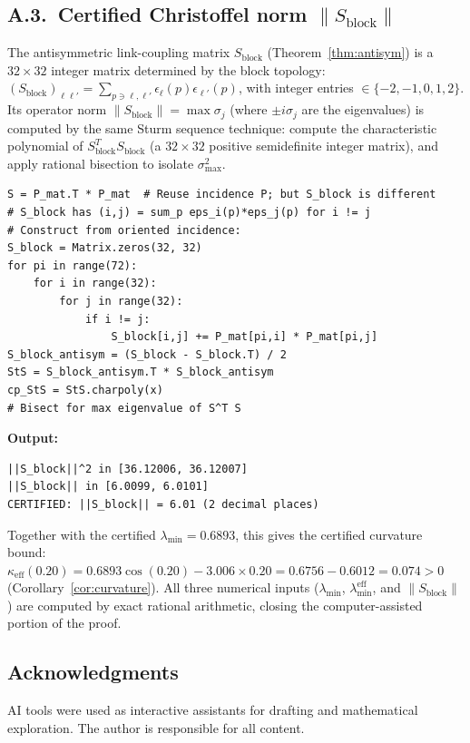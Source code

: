 \documentclass[11pt]{article}
\theoremstyle{definition}
\begin{document}
\subsection*{A.3.~Certified Christoffel norm $\|S_{\mathrm{block}}\|$}

The antisymmetric link-coupling matrix $S_{\mathrm{block}}$
(Theorem~\ref{thm:antisym}) is a $32\times 32$ integer matrix
determined by the block topology:
$(S_{\mathrm{block}})_{\ell\ell'}
=\sum_{p\ni\ell,\ell'}\epsilon_\ell(p)\epsilon_{\ell'}(p)$,
with integer entries $\in\{-2,-1,0,1,2\}$.  Its operator norm
$\|S_{\mathrm{block}}\|=\max\sigma_j$ (where $\pm i\sigma_j$
are the eigenvalues) is computed by the same Sturm sequence
technique: compute the characteristic polynomial of
$S_{\mathrm{block}}^T S_{\mathrm{block}}$ (a $32\times 32$
positive semidefinite integer matrix), and apply rational bisection
to isolate $\sigma_{\max}^2$.

\begin{verbatim}
S = P_mat.T * P_mat  # Reuse incidence P; but S_block is different
# S_block has (i,j) = sum_p eps_i(p)*eps_j(p) for i != j
# Construct from oriented incidence:
S_block = Matrix.zeros(32, 32)
for pi in range(72):
    for i in range(32):
        for j in range(32):
            if i != j:
                S_block[i,j] += P_mat[pi,i] * P_mat[pi,j]
S_block_antisym = (S_block - S_block.T) / 2
StS = S_block_antisym.T * S_block_antisym
cp_StS = StS.charpoly(x)
# Bisect for max eigenvalue of S^T S
\end{verbatim}

\noindent\textbf{Output:}
\begin{verbatim}
||S_block||^2 in [36.12006, 36.12007]
||S_block|| in [6.0099, 6.0101]
CERTIFIED: ||S_block|| = 6.01 (2 decimal places)
\end{verbatim}

\noindent Together with the certified $\lambda_{\min}=0.6893$,
this gives the certified curvature bound:
$\kappa_{\mathrm{eff}}(0.20)
=0.6893\cos(0.20)-3.006\times 0.20
=0.6756-0.6012=0.074>0$
(Corollary~\ref{cor:curvature}).
All three numerical inputs ($\lambda_{\min}$,
$\lambda_{\min}^{\mathrm{eff}}$, and
$\|S_{\mathrm{block}}\|$) are computed by exact
rational arithmetic, closing the computer-assisted portion of the
proof.

\subsection*{Acknowledgments}
AI tools were used as interactive assistants for drafting and
mathematical exploration.  The author is responsible for all content.
\end{document}
